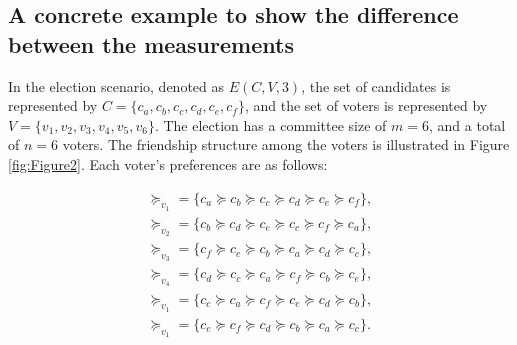 \documentclass{article}
\begin{document}
\subsection{A concrete example to show the difference between the measurements}
In the election scenario, denoted as $E(C,V,3)$, the set of candidates is represented by $C = \{c_a,c_b,c_c,c_d,c_e,c_f\}$, and the set of voters is represented by $V = \{v_1,v_2,v_3,v_4,v_5,v_6\}$. The election has a committee size of $m = 6$, and a total of $n = 6$ voters. The friendship structure among the voters is illustrated in Figure \ref{fig:Figure2}. Each voter's preferences are as follows:


\begin{align*}
\succeq_{v_1} =  \{c_a\succeq c_b \succeq c_c\succeq c_d\succeq c_e\succeq c_f\},\\  \succeq_{v_2} =  \{c_b\succeq c_d \succeq c_e\succeq c_c\succeq c_f\succeq c_a\},\\ \succeq_{v_3} =  \{c_f\succeq c_e \succeq c_b\succeq c_a\succeq c_d\succeq c_c\}, \\\succeq_{v_4} =  \{c_d\succeq c_c \succeq c_a\succeq c_f\succeq c_b\succeq c_e\},\\\succeq_{v_1} =  \{c_c\succeq c_a \succeq c_f\succeq c_e\succeq c_d\succeq c_b\},\\\succeq_{v_1} =  \{c_e\succeq c_f \succeq c_d\succeq c_b\succeq c_a\succeq c_c\}. 
\end{align*}
\theoremstyle{definition}
\newtheorem{example1}{Example}[section]
\end{document}

